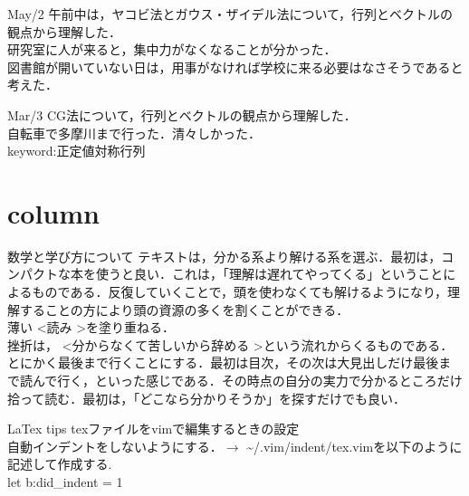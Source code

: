 \documentclass[11pt, a4paper]{jsarticle}
\begin{document}
\begin{itembox}[r]{May/2}
午前中は，ヤコビ法とガウス・ザイデル法について，行列とベクトルの観点から理解した．\\
研究室に人が来ると，集中力がなくなることが分かった．\\
図書館が開いていない日は，用事がなければ学校に来る必要はなさそうであると考えた．
\end{itembox}

\begin{itembox}[r]{Mar/3}
CG法について，行列とベクトルの観点から理解した．\\
自転車で多摩川まで行った．清々しかった．\\
keyword:正定値対称行列
\end{itembox}

\section{column}
\begin{itembox}[c]{数学と学び方について}
	テキストは，分かる系より解ける系を選ぶ．最初は，コンパクトな本を使うと良い．これは，「理解は遅れてやってくる」ということによるものである．反復していくことで，頭を使わなくても解けるようになり，理解することの方により頭の資源の多くを割くことができる．\\
薄い \textless 読み \textgreater を塗り重ねる．\\
	挫折は， \textless 分からなくて苦しいから辞める \textgreater という流れからくるものである．とにかく最後まで行くことにする．最初は目次，その次は大見出しだけ最後まで読んで行く，といった感じである．その時点の自分の実力で分かるところだけ拾って読む．最初は，「どこなら分かりそうか」を探すだけでも良い．
\end{itembox}

\begin{itembox}[c]{LaTex tips}
texファイルをvimで編集するときの設定\\
自動インデントをしないようにする．$\rightarrow$ \textasciitilde/.vim/indent/tex.vimを以下のように記述して作成する.\\
let b:did\_indent = 1
\end{itembox}
\end{document}

